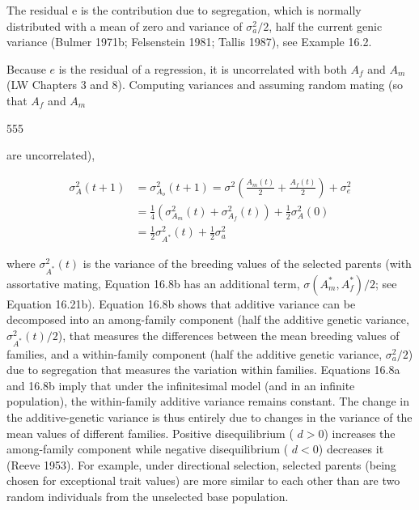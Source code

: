 \documentclass{article}
\begin{document}
The residual e is the contribution due to segregation, which is normally distributed with a mean of zero and variance of  $ \sigma_{a}^{2}/2 $, half the current genic variance (Bulmer 1971b; Felsenstein 1981; Tallis 1987), see Example 16.2.

Because $e$ is the residual of a regression, it is uncorrelated with both $A_f$ and $A_m$ (LW Chapters 3 and 8). Computing variances and assuming random mating (so that $A_f$ and $A_m$

555

are uncorrelated),

\begin{equation}
\begin{aligned}\sigma_{A}^{2}(t+1)&=\sigma_{A_{o}}^{2}(t+1)=\sigma^{2}\left(\frac{A_{m}(t)}{2}+\frac{A_{f}(t)}{2}\right)+\sigma_{e}^{2}\\&=\frac{1}{4}\left(\sigma_{A_{m}}^{2}(t)+\sigma_{A_{f}}^{2}(t)\right)+\frac{1}{2}\sigma_{A}^{2}(0)\\&=\frac{1}{2}\sigma_{A^{*}}^{2}(t)+\frac{1}{2}\sigma_{a}^{2}\end{aligned}
\tag{16.8b}
\label{eq:16_8b}
\end{equation}

where  $ \sigma_{A^*}^2(t) $ is the variance of the breeding values of the selected parents (with assortative mating, Equation 16.8b has an additional term,  $ \sigma(A_m^*, A_f^*)/2 $; see Equation 16.21b). Equation 16.8b shows that additive variance can be decomposed into an among-family component (half the additive genetic variance,  $ \sigma_{A^*}^2(t)/2 $), that measures the differences between the mean breeding values of families, and a within-family component (half the additive genetic variance,  $ \sigma_a^2/2 $) due to segregation that measures the variation within families. Equations 16.8a and 16.8b imply that under the infinitesimal model (and in an infinite population), the within-family additive variance remains constant. The change in the additive-genetic variance is thus entirely due to changes in the variance of the mean values of different families. Positive disequilibrium ( $ d > 0 $) increases the among-family component while negative disequilibrium ( $ d < 0 $) decreases it (Reeve 1953). For example, under directional selection, selected parents (being chosen for exceptional trait values) are more similar to each other than are two random individuals from the unselected base population.
\end{document}
